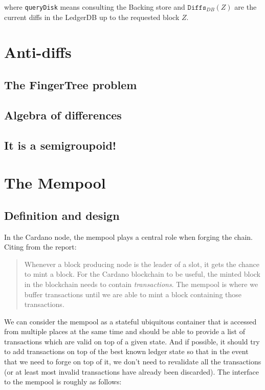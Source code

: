 \documentclass[11pt,a4paper]{article}
\theoremstyle{definition}
\begin{document}
where \texttt{queryDisk} means consulting the Backing store and $\texttt{Diffs}_{DB}(Z)$ are the current diffs in the LedgerDB up to the requested block $Z$.

\section{Anti-diffs}

\subsection{The FingerTree problem}

\subsection{Algebra of differences}

\subsection{It is a semigroupoid!}

\section{The Mempool}

\subsection{Definition and design}

In the Cardano node, the mempool plays a central role when forging the chain. Citing from the report:
\begin{quote}
  Whenever a block producing node is the leader of a slot, it gets the chance to
  mint a block. For the Cardano blockchain to be useful, the minted block in the
  blockchain needs to contain \emph{transactions}. The mempool is where we buffer
  transactions until we are able to mint a block containing those transactions.
\end{quote}

We can consider the mempool as a stateful ubiquitous container that is accessed
from multiple places at the same time and should be able to provide a list of
transactions which are valid on top of a given state. And if possible, it should
try to add transactions on top of the best known ledger state so that in the
event that we need to forge on top of it, we don't need to revalidate all the
transactions (or at least most invalid transactions have already been
discarded). The interface to the mempool is roughly as follows:
\end{document}
